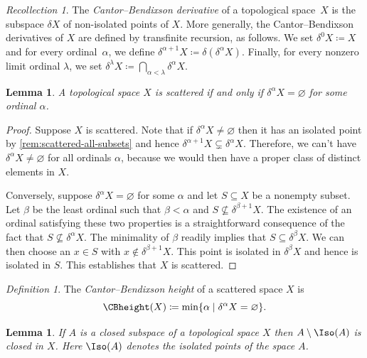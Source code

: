\documentclass{amsart}
\numberwithin{equation}{section}%
\newtheorem{Lem}[equation]{Lemma}
\theoremstyle{remark}
\newtheorem{Def}[equation]{Definition}
\newtheorem{Rec}[equation]{Recollection}
\renewcommand{\emptyset}{\varnothing}
\begin{document}
\begin{Rec}\label{def:CBtodo}
	The \emph{Cantor--Bendixson derivative} of a topological space~$X$ is the subspace $\delta X$ of non-isolated points of $X$. More generally,  the Cantor--Bendixson derivatives of $X$ are defined by transfinite recursion, as follows. We set $\delta^0 X \coloneqq X$ and for every ordinal~$\alpha$, we define $\delta^{\alpha+1} X \coloneqq \delta(\delta^\alpha X)$. Finally, for every nonzero limit ordinal $\lambda$, we set $\delta^\lambda X \coloneqq \bigcap_{\alpha < \lambda} \delta^\alpha X$.
\end{Rec} 

\begin{Lem}\label{lem:scattered-CB}
	A topological space $X$ is scattered if and only if $\delta^\alpha X = \emptyset$ for some ordinal $\alpha$.
\end{Lem}

\begin{proof}
	Suppose $X$ is scattered. Note that if $\delta^\alpha X\neq \emptyset$ then it has an isolated point by \cref{rem:scattered-all-subsets} and hence $\delta^{\alpha+1}X \subsetneq \delta^\alpha X$. Therefore, we can't have $\delta^\alpha X \neq \emptyset$ for all ordinals $\alpha$, because we would then have a proper class of distinct elements in $X$.

	Conversely, suppose $\delta^\alpha X = \emptyset$ for some $\alpha$ and let $S\subseteq X$ be a nonempty subset. Let $\beta$ be the least ordinal such that $\beta < \alpha$ and $S \not\subseteq \delta^{\beta+1} X$. The existence of an ordinal satisfying these two properties is a straightforward consequence of the fact that $S \not\subseteq \delta^\alpha X$. The minimality of $\beta$ readily implies that $S \subseteq \delta^\beta X$. We can then choose an $x \in S$ with $x \not\in \delta^{\beta +1}X$. This point is isolated in $\delta^\beta X$ and hence is isolated in $S$. This establishes that $X$ is scattered.
\end{proof}

\begin{Def}
	The \emph{Cantor--Bendixson height} of a scattered space $X$ is
	\[
		\CBheight(X) \coloneqq \min\{ \alpha \mid \delta^\alpha X = \emptyset \}.
	\]
\end{Def}

\begin{Lem}
	If $A$ is a closed subspace of a topological space $X$ then $A \setminus \Iso(A)$ is closed in $X$. Here $\Iso(A)$ denotes the isolated points of the space $A$.
\end{Lem}
\end{document}
